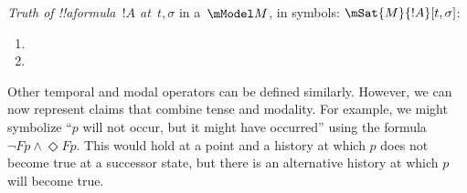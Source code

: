 \documentclass[../../../include/open-logic-section]{subfiles}
\begin{document}
\begin{defn}
  \emph{Truth of !!a{formula}~$!A$ at~$t, \sigma$} in a~$\mModel M$, in symbols:
  $\mSat{M}{!A}[t, \sigma]$:
  \begin{enumerate}
\item{}
 \item{}
  \end{enumerate} 
\end{defn}

Other temporal and modal operators can be defined similarly. However, we can now represent claims
that combine tense and modality. For example, we might symbolize ``$p$ will not occur, but it might
have occurred'' using the formula $\lnot F p \land \Diamond F p$. This would hold at a point and a history
at which $p$ does not become true at a successor state, but there is an alternative history at which $p$
will become true. 
\end{document}
